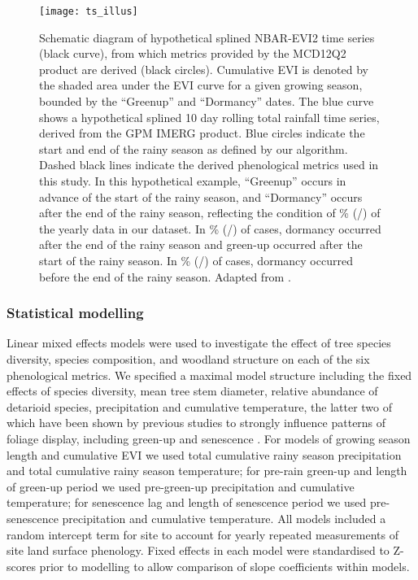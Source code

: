 \documentclass[11pt,a4paper]{article}
\begin{document}
\begin{figure}[H]
\centering
	\texttt{[image: ts\_illus]}
	\caption{Schematic diagram of hypothetical splined NBAR-EVI2 time series
		(black curve), from which metrics provided by the MCD12Q2 product are
		derived (black circles). Cumulative EVI is denoted by the shaded area under the EVI
		curve for a given growing season, bounded by the ``Greenup'' and ``Dormancy''
		dates. The blue curve shows a hypothetical splined 10 day rolling total
		rainfall time series, derived from the GPM IMERG product. Blue circles indicate
		the start and end of the rainy season as defined by our algorithm. Dashed black
		lines indicate the derived phenological metrics used in this study. In this
		hypothetical example, ``Greenup'' occurs in advance of the start of the rainy
		season, and ``Dormancy'' occurs after the end of the rainy season, reflecting
		the condition of \posGrePer{}\% (\posGre{}/\nTable{}) of the yearly data in our
		dataset. In \posSenPer{}\% (\posSen{}/\nTable{}) of cases, dormancy occurred
		after the end of the rainy season and green-up occurred after the start of the
		rainy season. In \negSenPer{}\% (\negSen{}/\nTable{}) of cases, dormancy
		occurred before the end of the rainy season. Adapted from \citet{Gray2022}.}
	\label{ts_illus}
\end{figure}

\subsubsection{Statistical modelling}

Linear mixed effects models were used to investigate the effect of tree species
diversity, species composition, and woodland structure on each of the six
phenological metrics. We specified a maximal model structure including the
fixed effects of species diversity, mean tree stem diameter, relative abundance
of detarioid species, precipitation and cumulative temperature, the latter two
of which have been shown by previous studies to strongly influence patterns of
foliage display, including green-up and senescence \citep{Whitecross2017,
Adole2019}. For models of growing season length and
cumulative EVI we used total cumulative rainy season precipitation and total
cumulative rainy season temperature; for pre-rain green-up and length of
green-up period we used pre-green-up precipitation and cumulative temperature;
for senescence lag and length of senescence period we used pre-senescence
precipitation and cumulative temperature. All models included a random
intercept term for site to account for yearly repeated measurements of site
land surface phenology. Fixed effects in each model were standardised to
Z-scores prior to modelling to allow comparison of slope coefficients within
models. 
\end{document}
